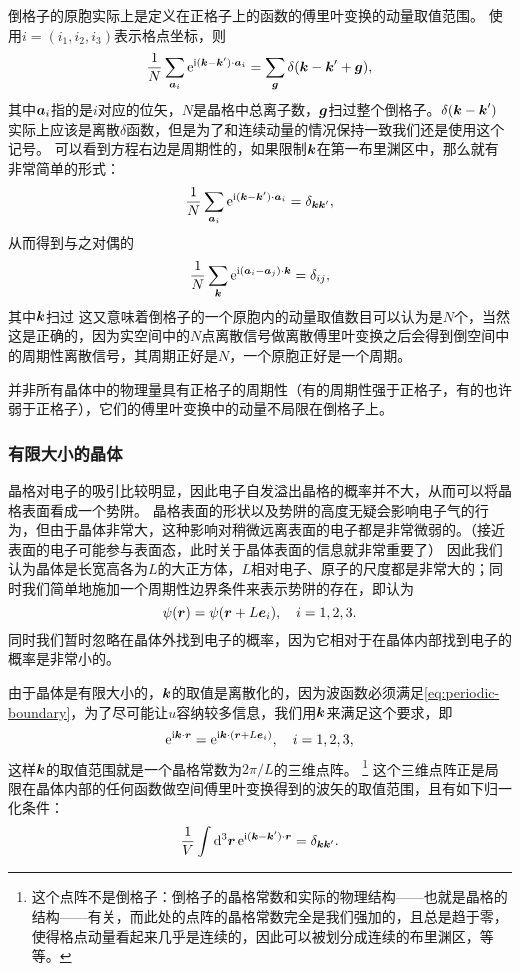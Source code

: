 倒格子的原胞实际上是定义在正格子上的函数的傅里叶变换的动量取值范围。
使用$i=(i_1, i_2, i_3)$表示格点坐标，则
\begin{equation}
    \frac{1}{N} \sum_{\vb*{a}_i} \mathrm{e}^{\mathrm{i} (\vb*{k} - \vb*{k}') \cdot \vb*{a}_i} = \sum_{\vb*{g}} \delta(\vb*{k} - \vb*{k}' + \vb*{g}),
\end{equation}
其中$\vb*{a}_i$指的是$i$对应的位矢，$N$是晶格中总离子数，$\vb*{g}$扫过整个倒格子。$\delta(\vb*{k} - \vb*{k}')$实际上应该是离散$\delta$函数，但是为了和连续动量的情况保持一致我们还是使用这个记号。
可以看到方程右边是周期性的，如果限制$\vb*{k}$在第一布里渊区中，那么就有非常简单的形式：
\begin{equation}
    \frac{1}{N} \sum_{\vb*{a}_i} \mathrm{e}^{\mathrm{i} (\vb*{k} - \vb*{k}') \cdot \vb*{a}_i} = \delta_{\vb*{k} \vb*{k}'},
\end{equation}
从而得到与之对偶的
\[
    \frac{1}{N} \sum_{\vb*{k}} \mathrm{e}^{\mathrm{i} (\vb*{a}_i - \vb*{a}_j) \cdot \vb*{k}} = \delta_{ij},
\]
其中$\vb*{k}$扫过
这又意味着倒格子的一个原胞内的动量取值数目可以认为是$N$个，当然这是正确的，因为实空间中的$N$点离散信号做离散傅里叶变换之后会得到倒空间中的周期性离散信号，其周期正好是$N$，一个原胞正好是一个周期。

并非所有晶体中的物理量具有正格子的周期性（有的周期性强于正格子，有的也许弱于正格子），它们的傅里叶变换中的动量不局限在倒格子上。

\subsubsection{有限大小的晶体}

晶格对电子的吸引比较明显，因此电子自发溢出晶格的概率并不大，从而可以将晶格表面看成一个势阱。
晶格表面的形状以及势阱的高度无疑会影响电子气的行为，但由于晶体非常大，这种影响对稍微远离表面的电子都是非常微弱的。（接近表面的电子可能参与表面态，此时关于晶体表面的信息就非常重要了）
因此我们认为晶体是长宽高各为$L$的大正方体，$L$相对电子、原子的尺度都是非常大的；同时我们简单地施加一个周期性边界条件来表示势阱的存在，即认为
\begin{equation}
    \psi(\vb*{r}) = \psi(\vb*{r} + L \vb*{e}_i), \quad i = 1, 2, 3.
    \label{eq:periodic-boundary}
\end{equation}
同时我们暂时忽略在晶体外找到电子的概率，因为它相对于在晶体内部找到电子的概率是非常小的。

由于晶体是有限大小的，$\vb*{k}$的取值是离散化的，因为波函数必须满足\eqref{eq:periodic-boundary}，为了尽可能让$u$容纳较多信息，我们用$\vb*{k}$来满足这个要求，即
\[
    \mathrm{e}^{\mathrm{i} \vb*{k} \cdot \vb*{r}} = \mathrm{e}^{\mathrm{i} \vb*{k} \cdot (\vb*{r} + L \vb*{e}_i)}, \quad i = 1, 2, 3,
\]
这样$\vb*{k}$的取值范围就是一个晶格常数为$2\pi / L$的三维点阵。%
\footnote{这个点阵不是倒格子：倒格子的晶格常数和实际的物理结构——也就是晶格的结构——有关，而此处的点阵的晶格常数完全是我们强加的，且总是趋于零，使得格点动量看起来几乎是连续的，因此可以被划分成连续的布里渊区，等等。
}%
这个三维点阵正是局限在晶体内部的任何函数做空间傅里叶变换得到的波矢的取值范围，且有如下归一化条件：
\begin{equation}
    \frac{1}{V} \int \dd[3]{\vb*{r}} \mathrm{e}^{\mathrm{i} (\vb*{k} - \vb*{k}') \cdot \vb*{r}} = \delta_{\vb*{k}\vb*{k}'}.
\end{equation}

